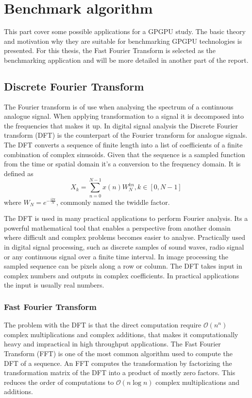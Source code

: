 \chapter{Benchmark algorithm}\label{cha:algorithms}
This part cover some possible applications for a GPGPU study. The basic theory and motivation why they are suitable for benchmarking GPGPU technologies is presented. For this thesis, the Fast Fourier Transform is selected as the benchmarking application and will be more detailed in another part of the report.

\newtheorem{thm}{Theorem}[chapter] %
\theoremstyle{definition}
\newtheorem{defn}[thm]{Definition} 

\section{Discrete Fourier Transform}
The Fourier transform is of use when analysing the spectrum of a continuous analogue signal. When applying transformation to a signal it is decomposed into the frequencies that makes it up. In digital signal analysis the Discrete Fourier transform (DFT) is the counterpart of the Fourier transform for analogue signals. The DFT converts a sequence of finite length into a list of coefficients of a finite combination of complex sinusoids. Given that the sequence is a sampled function from the time or spatial domain it's a conversion to the frequency domain. It is defined as
\begin{equation}
	X_k=\sum_{n=0}^{N-1}x(n)W_N^{kn}, k \in {[0, N-1]}	
\end{equation}
where $W_N=e^{-\frac{i2{\pi}}{N}}$, commonly named the twiddle factor\cite{Gentleman1966}.

The DFT is used in many practical applications to perform Fourier analysis. Its a powerful mathematical tool that enables a perspective from another domain where difficult and complex problems becomes easier to analyse. Practically used in digital signal processing, such as discrete samples of sound waves, radio signal or any continuous signal over a finite time interval. In image processing the sampled sequence can be pixels along a row or column. The DFT takes input in complex numbers and outputs in complex coefficients. In practical applications the input is usually real numbers.

\subsection{Fast Fourier Transform}\label{sec:algorithms:fft}
The problem with the DFT is that the direct computation require $\mathcal{O}(n^n)$ complex multiplications and complex additions, that makes it computationally heavy and impractical in high throughput applications. The Fast Fourier Transform (FFT) is one of the most common algorithm used to compute the DFT of a sequence. An FFT computes the transformation by factorizing the transformation matrix of the DFT into a product of mostly zero factors. This reduces the order of computations to $\mathcal{O}(n\log{}n)$ complex multiplications and additions.

